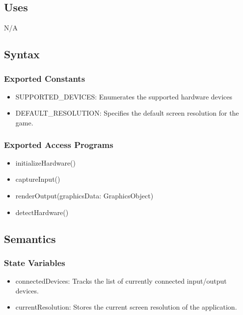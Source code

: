\documentclass[12pt, titlepage]{article}
\begin{document}
\subsection{Uses}
\hspace{1.5em}N/A

\subsection{Syntax}

\subsubsection{Exported Constants}
\begin{itemize}
\item SUPPORTED\_DEVICES: Enumerates the supported hardware devices

\item DEFAULT\_RESOLUTION: Specifies the default screen resolution for the game.
\end{itemize}

\subsubsection{Exported Access Programs}

\begin{itemize}
\item initializeHardware()
\item captureInput()
\item renderOutput(graphicsData: GraphicsObject)
\item detectHardware()
\end{itemize}

\subsection{Semantics}

\subsubsection{State Variables}
\begin{itemize}
\item connectedDevices: Tracks the list of currently connected input/output devices.
\item currentResolution: Stores the current screen resolution of the application.
\end{itemize}
\end{document}
